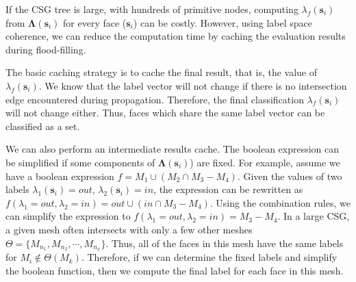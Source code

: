 If the CSG tree is large, with hundreds of primitive nodes, computing $\lambda_f(\bm{s}_i)$ from $\boldsymbol{\Lambda}(\bm{s}_i)$ for every face ($\bm{s}_i$) can be costly. However, using label space coherence, we can reduce the computation time by caching the evaluation results during flood-filling.


The basic caching strategy is to cache the final result, that is, the value of $\lambda_f(\bm{s}_i)$. We know that the label vector will not change if there is no intersection edge encountered during propagation. Therefore, the final classification $\lambda_f(\bm{s}_i)$ will not change either. Thus, faces which share the same label vector can be classified as a set.


We can also perform an intermediate results cache. The boolean expression can be simplified if some components of $\bm{\Lambda}(\bm{s}_i)$) are fixed. For example, assume we have a boolean expression $f = M_1\cup (M_2\cap M_3-M_4)$. Given the values of two labels $\lambda_1(\bm{s}_i)=out$, $\lambda_2(\bm{s}_i)=in$, the expression can be rewritten as $f(\lambda_1=out, \lambda_2=in)=out\cup (in\cap M_3-M_4)$. Using the combination rules, we can simplify the expression to $f(\lambda_1=out, \lambda_2=in)=M_3-M_4$. In a large CSG, a given mesh often intersects with only a few other meshes $\Theta= \{M_{n_1}, M_{n_2}, \cdots, M_{n_x}\}$. Thus, all of the faces in this mesh have the same labels for $M_{i} \notin \Theta(M_k)$. Therefore, if we can determine the fixed labels and simplify the boolean function, then we compute the final label for each face in this mesh.


